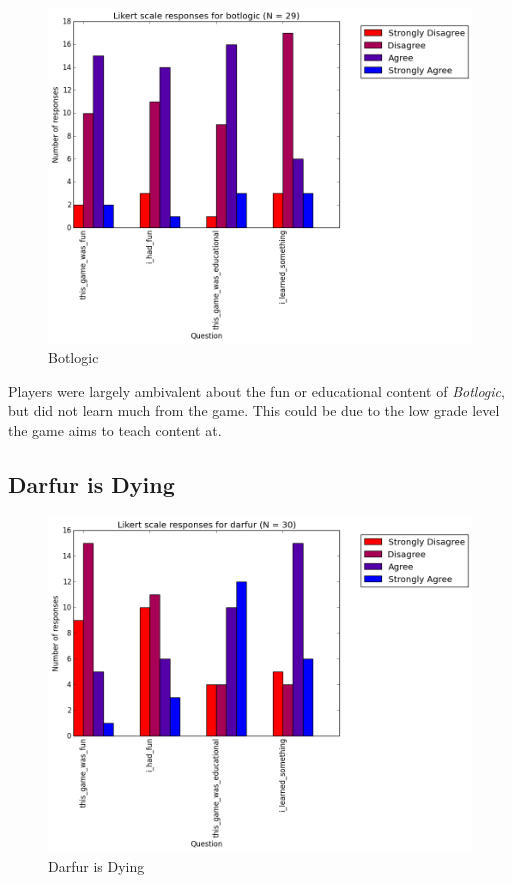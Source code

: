 				\begin{figure}[] 
				\centering 
				\includegraphics[width=\textwidth, height=.4\textheight, keepaspectratio=true]{botlogic_likert.png} 
				\caption{Botlogic}
				\end{figure}

				Players were largely ambivalent about the fun or educational content of \textit{Botlogic}, but did not learn much from the game. This could be due to the low grade level the game aims to teach content at. 

			\subsection{Darfur is Dying}

				\begin{figure}[] 
				\centering 
				\includegraphics[width=\textwidth, height=.4\textheight, keepaspectratio=true]{darfur_likert.png} 
				\caption{Darfur is Dying}
				\end{figure}

